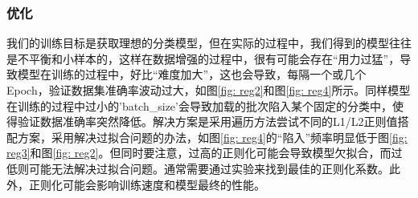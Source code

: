 \documentclass[a4paper, 10pt]{article}
\begin{document}
	\subsubsection{优化}
	
	我们的训练目标是获取理想的分类模型，但在实际的过程中，我们得到的模型往往是不平衡和小样本的，这样在数据增强的过程中，很有可能会存在“用力过猛”，导致模型在训练的过程中，好比“难度加大”，这也会导致，每隔一个或几个 Epoch，验证数据集准确率波动过大，如图\ref{fig: reg2}和图\ref{fig: reg4}所示。同样模型在训练的过程中过小的'batch\_size'会导致加载的批次陷入某个固定的分类中，使得验证数据准确率突然降低。解决方案是采用遍历方法尝试不同的L1/L2正则值搭配方案，采用解决过拟合问题的办法，如图\ref{fig: reg4}的“陷入”频率明显低于图\ref{fig: reg3}和图\ref{fig: reg2}。但同时要注意，过高的正则化可能会导致模型欠拟合，而过低则可能无法解决过拟合问题。通常需要通过实验来找到最佳的正则化系数。此外，正则化可能会影响训练速度和模型最终的性能\cite{8496892}。
	
\end{document}
